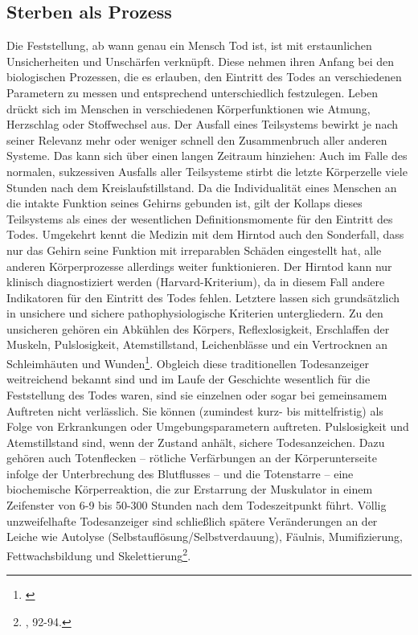 \documentclass[openany,twoside,twocolumn]{book}
\let\rmarkdownfootnote\footnote%
\def\footnote{\protect\rmarkdownfootnote}
\begin{document}
\hypertarget{sterben-als-prozess}{%
\subsection{Sterben als Prozess}\label{sterben-als-prozess}}

Die Feststellung, ab wann genau ein Mensch Tod ist, ist mit
erstaunlichen Unsicherheiten und Unschärfen verknüpft. Diese nehmen
ihren Anfang bei den biologischen Prozessen, die es erlauben, den
Eintritt des Todes an verschiedenen Parametern zu messen und
entsprechend unterschiedlich festzulegen. Leben drückt sich im Menschen
in verschiedenen Körperfunktionen wie Atmung, Herzschlag oder
Stoffwechsel aus. Der Ausfall eines Teilsystems bewirkt je nach seiner
Relevanz mehr oder weniger schnell den Zusammenbruch aller anderen
Systeme. Das kann sich über einen langen Zeitraum hinziehen: Auch im
Falle des normalen, sukzessiven Ausfalls aller Teilsysteme stirbt die
letzte Körperzelle viele Stunden nach dem Kreislaufstillstand. Da die
Individualität eines Menschen an die intakte Funktion seines Gehirns
gebunden ist, gilt der Kollaps dieses Teilsystems als eines der
wesentlichen Definitionsmomente für den Eintritt des Todes. Umgekehrt
kennt die Medizin mit dem Hirntod auch den Sonderfall, dass nur das
Gehirn seine Funktion mit irreparablen Schäden eingestellt hat, alle
anderen Körperprozesse allerdings weiter funktionieren. Der Hirntod kann
nur klinisch diagnostiziert werden (Harvard-Kriterium), da in diesem
Fall andere Indikatoren für den Eintritt des Todes fehlen. Letztere
lassen sich grundsätzlich in unsichere und sichere pathophysiologische
Kriterien untergliedern. Zu den unsicheren gehören ein Abkühlen des
Körpers, Reflexlosigkeit, Erschlaffen der Muskeln, Pulslosigkeit,
Atemstillstand, Leichenblässe und ein Vertrocknen an Schleimhäuten und
Wunden\footnote{\textcite{forster_stichwort_1989}}. Obgleich diese
traditionellen Todesanzeiger weitreichend bekannt sind und im Laufe der
Geschichte wesentlich für die Feststellung des Todes waren, sind sie
einzelnen oder sogar bei gemeinsamem Auftreten nicht verlässlich. Sie
können (zumindest kurz- bis mittelfristig) als Folge von Erkrankungen
oder Umgebungsparametern auftreten. Pulslosigkeit und Atemstillstand
sind, wenn der Zustand anhält, sichere Todesanzeichen. Dazu gehören auch
Totenflecken -- rötliche Verfärbungen an der Körperunterseite infolge
der Unterbrechung des Blutflusses -- und die Totenstarre -- eine
biochemische Körperreaktion, die zur Erstarrung der Muskulator in einem
Zeifenster von 6-9 bis 50-300 Stunden nach dem Todeszeitpunkt führt.
Völlig unzweifelhafte Todesanzeiger sind schließlich spätere
Veränderungen an der Leiche wie Autolyse
(Selbstauflösung/Selbstverdauung), Fäulnis, Mumifizierung,
Fettwachsbildung und Skelettierung\footnote{\textcite{hofmann_rituelle_2008},
  92-94.}.
\end{document}
